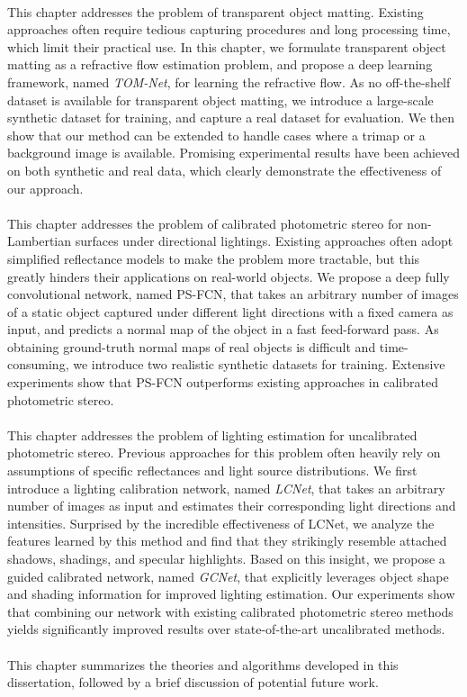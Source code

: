 \paragraph{} This chapter addresses the problem of transparent object matting. Existing approaches often require tedious capturing procedures and long processing time, which limit their practical use. In this chapter, we formulate transparent object matting as a refractive flow estimation problem, and propose a deep learning framework, named {\em TOM-Net}, for learning the refractive flow. As no off-the-shelf dataset is available for transparent object matting, we introduce a large-scale synthetic dataset for training, and capture a real dataset for evaluation. 
We then show that our method can be extended to handle cases where a trimap or a background image is available. 
Promising experimental results have been achieved on both synthetic and real data, which clearly demonstrate the effectiveness of our approach.

\paragraph{} This chapter addresses the problem of calibrated photometric stereo for non-Lambertian surfaces under directional lightings. Existing approaches often adopt simplified reflectance models to make the problem more tractable, but this greatly hinders their applications on real-world objects. 
We propose a deep fully convolutional network, named PS-FCN, that takes an arbitrary number of images of a static object captured under different light directions with a fixed camera as input, and predicts a normal map of the object in a fast feed-forward pass. 
As obtaining ground-truth normal maps of real objects is difficult and time-consuming, we introduce two realistic synthetic datasets for training.
Extensive experiments show that PS-FCN outperforms existing approaches in calibrated photometric stereo.

\paragraph{} This chapter addresses the problem of lighting estimation for uncalibrated photometric stereo. Previous approaches for this problem often heavily rely on assumptions of specific reflectances and light source distributions.
We first introduce a lighting calibration network, named \emph{LCNet}, that takes an arbitrary number of images as input and estimates their corresponding light directions and intensities.
Surprised by the incredible effectiveness of LCNet, we analyze the features learned by this method and find that they strikingly resemble attached shadows, shadings, and specular highlights. Based on this insight, we propose a guided calibrated network, named \emph{GCNet}, that explicitly leverages object shape and shading information for improved lighting estimation.
Our experiments show that combining our network with existing calibrated photometric stereo methods yields significantly improved results over state-of-the-art uncalibrated methods. 

\paragraph{} This chapter summarizes the theories and algorithms developed in this dissertation, followed by a brief discussion of potential future work.
